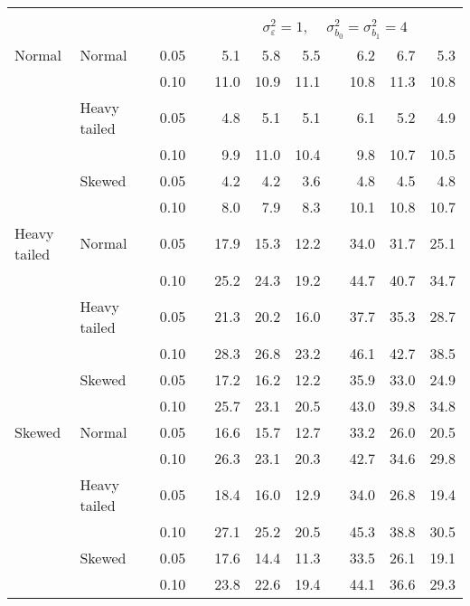 \begin{table}[ht]
\begin{scriptsize}
\begin{center}
\begin{tabular}{ll p{.1cm} c p{.1cm} rrr p{.1cm} rrr}
&&&&&&&&&&&\\
& && && \multicolumn{7}{c}{$\sigma_{\varepsilon}^2 = 1$, \ \ $\sigma_{b_0}^2 = \sigma_{b_1}^2 = 4$} \\ \cline{6-12}
Normal       & Normal       && 0.05 &&   5.1 & 5.8 & 5.5 &   & 6.2 & 6.7 & 5.3 \\ 
             &              && 0.10 &&   11.0 & 10.9 & 11.1 &   & 10.8 & 11.3 & 10.8 \\ 
             & Heavy tailed && 0.05 &&   4.8 & 5.1 & 5.1 &   & 6.1 & 5.2 & 4.9 \\ 
             &              && 0.10 &&   9.9 & 11.0 & 10.4 &   & 9.8 & 10.7 & 10.5 \\ 
             & Skewed       && 0.05 &&   4.2 & 4.2 & 3.6 &   & 4.8 & 4.5 & 4.8 \\ 
             &              && 0.10 &&   8.0 & 7.9 & 8.3 &   & 10.1 & 10.8 & 10.7 \\ 
Heavy tailed & Normal       && 0.05 &&   17.9 & 15.3 & 12.2 &   & 34.0 & 31.7 & 25.1 \\ 
             &              && 0.10 &&   25.2 & 24.3 & 19.2 &   & 44.7 & 40.7 & 34.7 \\ 
             & Heavy tailed && 0.05 &&   21.3 & 20.2 & 16.0 &   & 37.7 & 35.3 & 28.7 \\ 
             &              && 0.10 &&   28.3 & 26.8 & 23.2 &   & 46.1 & 42.7 & 38.5 \\ 
             & Skewed       && 0.05 &&   17.2 & 16.2 & 12.2 &   & 35.9 & 33.0 & 24.9 \\ 
             &              && 0.10 &&   25.7 & 23.1 & 20.5 &   & 43.0 & 39.8 & 34.8 \\ 
Skewed       & Normal       && 0.05 &&   16.6 & 15.7 & 12.7 &   & 33.2 & 26.0 & 20.5 \\ 
             &              && 0.10 &&   26.3 & 23.1 & 20.3 &   & 42.7 & 34.6 & 29.8 \\ 
             & Heavy tailed && 0.05 &&   18.4 & 16.0 & 12.9 &   & 34.0 & 26.8 & 19.4 \\ 
             &              && 0.10 &&   27.1 & 25.2 & 20.5 &   & 45.3 & 38.8 & 30.5 \\ 
             & Skewed       && 0.05 &&   17.6 & 14.4 & 11.3 &   & 33.5 & 26.1 & 19.1 \\ 
             &              && 0.10 &&   23.8 & 22.6 & 19.4 &   & 44.1 & 36.6 & 29.3 \\ 

\hline
\end{tabular}
\end{center}
\end{scriptsize}
\end{table}

